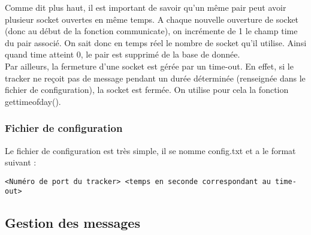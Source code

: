 Comme dit plus haut, il est important de savoir qu'un même pair peut avoir plusieur socket ouvertes en même temps. A chaque nouvelle ouverture de socket (donc au début de la fonction communicate), on incrémente de 1 le champ time du pair associé. On sait donc en temps réel le nombre de socket qu'il utilise. Ainsi quand time atteint 0, le pair est supprimé de la base de donnée.\\ 

Par ailleurs, la fermeture d'une socket est gérée par un time-out. En effet, si le tracker ne reçoit pas de message pendant un durée déterminée (renseignée dans le fichier de configuration), la socket est fermée. On utilise pour cela la fonction gettimeofday().

\subsubsection{Fichier de configuration}
Le fichier de configuration est très simple, il se nomme config.txt et a le format suivant :
\begin{verbatim}
<Numéro de port du tracker> <temps en seconde correspondant au time-out>
\end{verbatim}


\subsection{Gestion des messages}


